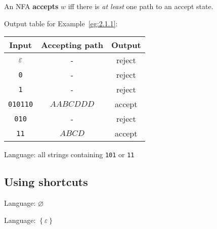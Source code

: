 \documentclass{notes}
\begin{document}
\newpage

\begin{defn}
  An NFA {\boldmath \bfseries accepts} $w$ iff there is \textit{at least} one path to an accept state.
\end{defn}

\begin{eg}
  Output table for Example~\ref{eg:2.1.1}:
  \begin{center}
    \begin{tabular}{ccc}
      Input & Accepting path & Output \\ 
      \hline
      $\varepsilon$ & - & reject \\ 
      \verb~0~ & - & reject \\ 
      \verb~1~ & - & reject \\ 
      \verb~010110~ & $AABCDDD$ & accept \\
      \verb~010~ & - & reject \\ 
      \verb~11~ & $ABCD$ & accept 
    \end{tabular}
  \end{center}
  
  \begin{center}
    Language: all strings containing \verb~101~ or \verb~11~
  \end{center}
\end{eg}

\subsection{Using shortcuts}

\begin{eg}
  Language: $\varnothing$
  
  \begin{center}
  \end{center}
\end{eg}

\begin{eg}
  Language: $\left \{ \varepsilon \right \}$

  \begin{center}
  \end{center}
\end{eg}
\end{document}
